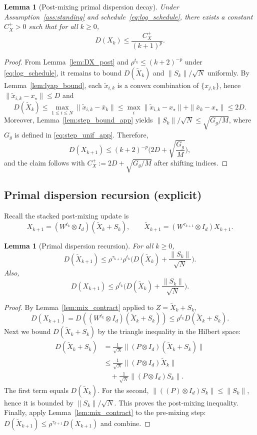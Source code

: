\documentclass[11pt,a4paper]{article}
\def\one{1}%
\def\J{J}%
\def\Pmat{P}%
\newtheorem{lemma}[theorem]{Lemma}
\newcommand{\one}{\mathbf{1}}
\newcommand{\J}{\left(\frac{1}{N}\one\one^\top\right)}
\newcommand{\Pmat}{I-\J}
\begin{document}
\begin{lemma}[Post-mixing primal dispersion decay]\label{lem:DX_post_decay}
Under Assumption~\ref{ass:standing} and schedule~\eqref{eq:log_schedule}, there exists a constant $C_X^{+}>0$ such that for all $k\ge 0$,
\[
D(X_k)\le \frac{C_X^{+}}{(k+1)^{p}}.
\]
\end{lemma}
\begin{proof}
From Lemma~\ref{lem:DX_post} and $\rho^{t_k}\le (k+2)^{-p}$ under \eqref{eq:log_schedule}, it remains to bound
$D(\tilde X_k)$ and $\|S_k\|/\sqrt N$ uniformly.
By Lemma~\ref{lem:lyap_bound}, each $\tilde x_{i,k}$ is a convex combination of $\{x_{j,k}\}$, hence $\|\tilde x_{i,k}-x_\star\|\le D$ and
\[
D(\tilde X_k)\le \max_{1\le i\le N}\|\tilde x_{i,k}-\bar x_k\|
\le \max_i \|\tilde x_{i,k}-x_\star\|+\|\bar x_k-x_\star\|\le 2D.
\]
Moreover, Lemma~\ref{lem:step_bound_app} yields $\|S_k\|/\sqrt N\le \sqrt{G_g/M}$, where $G_g$ is defined in \eqref{eq:step_unif_app}.
Therefore,
\[
D(X_{k+1})\le (k+2)^{-p}\Big(2D+\sqrt{\frac{G_g}{M}}\Big),
\]
and the claim follows with $C_X^{+}:=2D+\sqrt{G_g/M}$ after shifting indices.
\end{proof}

\subsection{Primal dispersion recursion (explicit)}

Recall the stacked post-mixing update is
\[
X_{k+1}=(W^{t_k}\otimes I_d)(\tilde X_k+S_k),
\qquad
\tilde X_{k+1}=(W^{\tau_{k+1}}\otimes I_d)X_{k+1}.
\]
\begin{lemma}[Primal dispersion recursion]\label{lem:DX_rec}
For all $k\ge0$,
\[
D(\tilde X_{k+1})
\le \rho^{\tau_{k+1}}\rho^{t_k}\Big(D(\tilde X_k)+\frac{\|S_k\|}{\sqrt N}\Big).
\]
Also,
\[
D(X_{k+1})
\le \rho^{t_k}\Big(D(\tilde X_k)+\frac{\|S_k\|}{\sqrt N}\Big).
\]
\end{lemma}
\begin{proof}
By Lemma~\ref{lem:mix_contract} applied to $Z=\tilde X_k+S_k$,
\[
D(X_{k+1})=D((W^{t_k}\otimes I_d)(\tilde X_k+S_k))\le \rho^{t_k}D(\tilde X_k+S_k).
\]
Next we bound $D(\tilde X_k+S_k)$ by the triangle inequality in the Hilbert space:
\begin{align*}
D(\tilde X_k\!+\!S_k)
&=\tfrac1{\sqrt N}\|(\Pmat\!\otimes\! I_d)(\tilde X_k\!+\!S_k)\|\\
&\le \tfrac1{\sqrt N}\|(\Pmat\!\otimes\! I_d)\tilde X_k\|\\
&\quad+\tfrac1{\sqrt N}\|(\Pmat\!\otimes\! I_d)S_k\|.
\end{align*}
The first term equals $D(\tilde X_k)$.
For the second, $\|((\Pmat)\otimes I_d)S_k\|\le \|S_k\|$, hence it is bounded by $\|S_k\|/\sqrt N$.
This proves the post-mixing inequality.
Finally, apply Lemma~\ref{lem:mix_contract} to the pre-mixing step:
$D(\tilde X_{k+1})\le \rho^{\tau_{k+1}}D(X_{k+1})$ and combine.
\end{proof}
\end{document}
